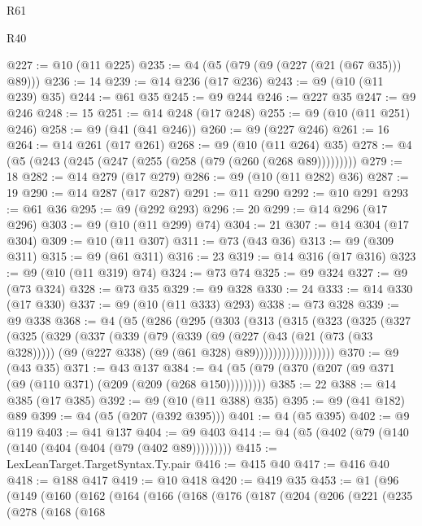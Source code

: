 \begin{lexlean}{R61}
\begin{lexlean}{R40}
\begin{coremodule}
{{{{{{{{{{{{{{{{{{{{{{{{{{{{{{{{{{{{{{{{{{{{{{{{{{{{{{{{{{{{{{{{{{{{{{{{{{{{{{{{{{{{{{{{{{{{{{{{{{{{{{{{{{{{{@227 := @10 (@11 @225)
@235 := @4 (@5 (@79 (@9 (@227 (@21 (@67 @35))) @89)))
@236 := 14
@239 := @14 @236 (@17 @236)
@243 := @9 (@10 (@11 @239) @35)
@244 := @61 @35
@245 := @9 @244
@246 := @227 @35
@247 := @9 @246
@248 := 15
@251 := @14 @248 (@17 @248)
@255 := @9 (@10 (@11 @251) @246)
@258 := @9 (@41 (@41 @246))
@260 := @9 (@227 @246)
@261 := 16
@264 := @14 @261 (@17 @261)
@268 := @9 (@10 (@11 @264) @35)
@278 := @4 (@5 (@243 (@245 (@247 (@255 (@258 (@79 (@260 (@268 @89)))))))))
@279 := 18
@282 := @14 @279 (@17 @279)
@286 := @9 (@10 (@11 @282) @36)
@287 := 19
@290 := @14 @287 (@17 @287)
@291 := @11 @290
@292 := @10 @291
@293 := @61 @36
@295 := @9 (@292 @293)
@296 := 20
@299 := @14 @296 (@17 @296)
@303 := @9 (@10 (@11 @299) @74)
@304 := 21
@307 := @14 @304 (@17 @304)
@309 := @10 (@11 @307)
@311 := @73 (@43 @36)
@313 := @9 (@309 @311)
@315 := @9 (@61 @311)
@316 := 23
@319 := @14 @316 (@17 @316)
@323 := @9 (@10 (@11 @319) @74)
@324 := @73 @74
@325 := @9 @324
@327 := @9 (@73 @324)
@328 := @73 @35
@329 := @9 @328
@330 := 24
@333 := @14 @330 (@17 @330)
@337 := @9 (@10 (@11 @333) @293)
@338 := @73 @328
@339 := @9 @338
@368 := @4
    (@5
      (@286
        (@295
          (@303
            (@313
              (@315
                (@323
                  (@325
                    (@327
                      (@325
                        (@329
                          (@337
                            (@339
                              (@79
                                (@339
                                  (@9
                                    (@227 (@43 (@21 (@73 (@33 @328)))))
                                    (@9 (@227 @338) (@9 (@61 @328) @89))))))))))))))))))
@370 := @9 (@43 @35)
@371 := @43 @137
@384 := @4 (@5 (@79 (@370 (@207 (@9 @371 (@9 (@110 @371) (@209 (@209 (@268 @150)))))))))
@385 := 22
@388 := @14 @385 (@17 @385)
@392 := @9 (@10 (@11 @388) @35)
@395 := @9 (@41 @182) @89
@399 := @4 (@5 (@207 (@392 @395)))
@401 := @4 (@5 @395)
@402 := @9 @119
@403 := @41 @137
@404 := @9 @403
@414 := @4 (@5 (@402 (@79 (@140 (@140 (@404 (@404 (@79 (@402 @89)))))))))
@415 := LexLeanTarget.TargetSyntax.Ty.pair
@416 := @415 @40
@417 := @416 @40
@418 := @188 @417
@419 := @10 @418
@420 := @419 @35
@453 := @1
    (@96
      (@149
        (@160
          (@162
            (@164
              (@166
                (@168
                  (@176
                    (@187
                      (@204
                        (@206
                          (@221
                            (@235
                              (@278
                                (@168
                                  (@168
}}}}}}}}}}}}}}}}}}}}}}}}}}}}}}}}}}}}}}}}}}}}}}}}}}}}}}}}}}}}}}}}}}}}}}}}}}}}}}}}}}}}}}}}}}}}}}}}}}}}}}}}}}}}}
\end{coremodule}
\end{lexlean}
\end{lexlean}
